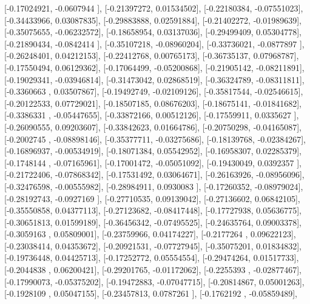 \documentclass{article}
\begin{document}
       [-0.17024921, -0.0607944 ],
       [-0.21397272,  0.01534502],
       [-0.22180384, -0.07551023],
       [-0.34433966,  0.03087835],
       [-0.29883888,  0.02591884],
       [-0.21402272, -0.01989639],
       [-0.35075655, -0.06232572],
       [-0.18658954,  0.03137036],
       [-0.29499409,  0.05304778],
       [-0.21890434, -0.0842414 ],
       [-0.35107218, -0.08960204],
       [-0.33736021, -0.0877897 ],
       [-0.26248401,  0.04212153],
       [-0.22412768,  0.00765173],
       [-0.36735137,  0.07968787],
       [-0.17550494,  0.06129362],
       [-0.17064499, -0.05200868],
       [-0.21905142, -0.08211891],
       [-0.19029341, -0.03946814],
       [-0.31473042,  0.02868519],
       [-0.36324789, -0.08311811],
       [-0.3360663 ,  0.03507867],
       [-0.19492749, -0.02109126],
       [-0.35817544, -0.02546615],
       [-0.20122533,  0.07729021],
       [-0.18507185,  0.08676203],
       [-0.18675141, -0.01841682],
       [-0.3386331 , -0.05447655],
       [-0.33872166,  0.00512126],
       [-0.17559911,  0.0335627 ],
       [-0.26090555,  0.09203607],
       [-0.33842623,  0.01664786],
       [-0.20750298, -0.04165087],
       [-0.2002745 , -0.08898146],
       [-0.35377711, -0.03275686],
       [-0.18139768, -0.02384267],
       [-0.16896937, -0.00534919],
       [-0.18071384,  0.05542952],
       [-0.16958307,  0.02285379],
       [-0.1748144 , -0.07165961],
       [-0.17001472, -0.05051092],
       [-0.19430049,  0.0392357 ],
       [-0.21722406, -0.07868342],
       [-0.17531492,  0.03064671],
       [-0.26163926, -0.08956096],
       [-0.32476598, -0.00555982],
       [-0.28984911,  0.0930083 ],
       [-0.17260352, -0.08979024],
       [-0.28192743, -0.0927169 ],
       [-0.27710535,  0.09139042],
       [-0.27136602,  0.06842105],
       [-0.35550858,  0.04377113],
       [-0.27123682, -0.08417448],
       [-0.17727938,  0.05636775],
       [-0.30651813,  0.01599189],
       [-0.36456342, -0.07495525],
       [-0.24635764,  0.09003378],
       [-0.3059163 ,  0.05809001],
       [-0.23759966,  0.04174227],
       [-0.2177264 ,  0.09622123],
       [-0.23038414,  0.04353672],
       [-0.20921531, -0.07727945],
       [-0.35075201,  0.01834832],
       [-0.19736448,  0.04425713],
       [-0.17252772,  0.05554554],
       [-0.29474264,  0.01517733],
       [-0.2044838 ,  0.06200421],
       [-0.29201765, -0.01172062],
       [-0.2255393 , -0.02877467],
       [-0.17990073, -0.05375202],
       [-0.19472883, -0.07047715],
       [-0.20814867,  0.05001263],
       [-0.1928109 ,  0.05047155],
       [-0.23457813,  0.0787261 ],
       [-0.1762192 , -0.05859489],
\end{document}
